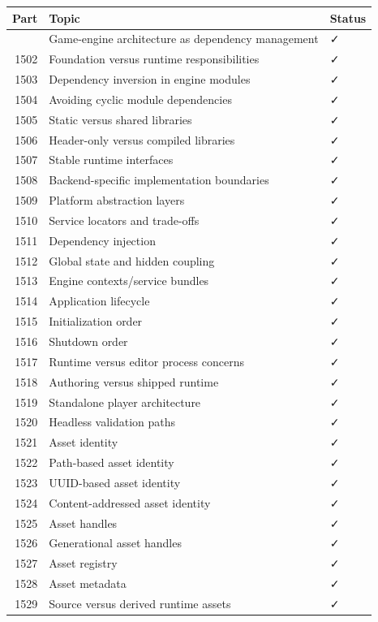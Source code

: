 {\def\LTcaptype{none} %
\begin{longtable}[]{@{}rll@{}}
\toprule\noalign{}
Part & Topic & Status \\
\midrule\noalign{}
\endhead
\bottomrule\noalign{}
\endlastfoot
1501 & Game-engine architecture as dependency management & ✓ \\
1502 & Foundation versus runtime responsibilities & ✓ \\
1503 & Dependency inversion in engine modules & ✓ \\
1504 & Avoiding cyclic module dependencies & ✓ \\
1505 & Static versus shared libraries & ✓ \\
1506 & Header-only versus compiled libraries & ✓ \\
1507 & Stable runtime interfaces & ✓ \\
1508 & Backend-specific implementation boundaries & ✓ \\
1509 & Platform abstraction layers & ✓ \\
1510 & Service locators and trade-offs & ✓ \\
1511 & Dependency injection & ✓ \\
1512 & Global state and hidden coupling & ✓ \\
1513 & Engine contexts/service bundles & ✓ \\
1514 & Application lifecycle & ✓ \\
1515 & Initialization order & ✓ \\
1516 & Shutdown order & ✓ \\
1517 & Runtime versus editor process concerns & ✓ \\
1518 & Authoring versus shipped runtime & ✓ \\
1519 & Standalone player architecture & ✓ \\
1520 & Headless validation paths & ✓ \\
1521 & Asset identity & ✓ \\
1522 & Path-based asset identity & ✓ \\
1523 & UUID-based asset identity & ✓ \\
1524 & Content-addressed asset identity & ✓ \\
1525 & Asset handles & ✓ \\
1526 & Generational asset handles & ✓ \\
1527 & Asset registry & ✓ \\
1528 & Asset metadata & ✓ \\
1529 & Source versus derived runtime assets & ✓ \\

\end{longtable}}
